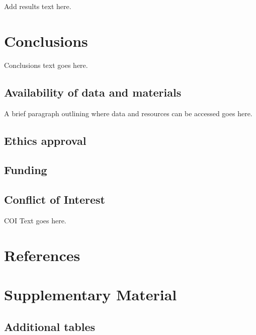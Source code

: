 \documentclass[
]{article}
\begin{document}
Add results text here.

\hypertarget{conclusions}{%
\section{Conclusions}\label{conclusions}}

Conclusions text goes here.

\hypertarget{availability-of-data-and-materials}{%
\subsection*{Availability of data and materials}\label{availability-of-data-and-materials}}

A brief paragraph outlining where data and resources can be accessed goes here.

\hypertarget{ethics-approval}{%
\subsection*{Ethics approval}\label{ethics-approval}}

\hypertarget{funding}{%
\subsection*{Funding}\label{funding}}

\hypertarget{conflict-of-interest}{%
\subsection*{Conflict of Interest}\label{conflict-of-interest}}

COI Text goes here.

\newpage

\hypertarget{references}{%
\section*{References}\label{references}}

\hypertarget{refs}{}

\newpage
\appendix
{}

\hypertarget{supplementary-material}{%
\section{Supplementary Material}\label{supplementary-material}}

\hypertarget{additional-tables}{%
\subsection{Additional tables}\label{additional-tables}}

\newpage
\end{document}
